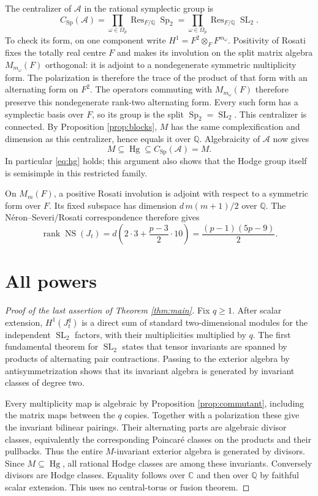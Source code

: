 \documentclass[11pt]{article}
\theoremstyle{remark}
\newcommand{\Q}{\mathbb Q}
\newcommand{\C}{\mathbb C}
\newcommand{\Hg}{\operatorname{Hg}}
\newcommand{\Sp}{\operatorname{Sp}}
\newcommand{\SL}{\operatorname{SL}}
\newcommand{\Res}{\operatorname{Res}}
\newcommand{\NS}{\operatorname{NS}}
\begin{document}
The centralizer of \(\mathcal A\) in the rational symplectic group is
\[
 C_{\Sp}(\mathcal A)=
       \prod_{\omega\in\Omega_p}\Res_{F/\Q}\Sp_2
       =\prod_{\omega\in\Omega_p}\Res_{F/\Q}\SL_2.
\]
To check its form, on one component write
\(H^1=F^2\otimes_F F^{m_\omega}\).  Positivity of Rosati fixes the
totally real centre \(F\) and makes its involution on the split matrix
algebra \(M_{m_\omega}(F)\) orthogonal: it is adjoint to a nondegenerate
symmetric multiplicity form.  The polarization is therefore the trace
of the product of that form with an alternating form on \(F^2\).
The operators commuting with \(M_{m_\omega}(F)\) therefore preserve
this nondegenerate rank-two alternating form.  Every such form has a
symplectic basis over \(F\), so its group is the split \(\Sp_2=\SL_2\).
This centralizer is connected.
By Proposition \ref{prop:blocks}, \(M\) has the same complexification
and dimension as this centralizer, hence equals it over \(\Q\).
Algebraicity of \(\mathcal A\) now gives
\[
 M\subseteq\Hg\subseteq C_{\Sp}(\mathcal A)=M.
\]
In particular \eqref{eq:hg} holds; this argument also shows that the
Hodge group itself is semisimple in this restricted family.

On \(M_m(F)\), a positive Rosati involution is adjoint with respect
to a symmetric form over \(F\).  Its fixed subspace has dimension
\(d\,m(m+1)/2\) over \(\Q\).
The N\'eron--Severi/Rosati correspondence therefore gives
\[
 \operatorname{rank}\NS(J_t)
 =d\left(2\cdot3+\frac{p-3}{2}\cdot10\right)
 =\frac{(p-1)(5p-9)}2.
\]

\section{All powers}
\begin{proof}[Proof of the last assertion of Theorem \ref{thm:main}]
Fix \(q\geq1\).  After scalar extension, \(H^1(J_t^q)\) is a direct
sum of standard two-dimensional modules for the independent
\(\SL_2\) factors, with their multiplicities multiplied by \(q\).
The first fundamental theorem for \(\SL_2\) states that tensor
invariants are spanned by products of alternating pair contractions.
Passing to the exterior algebra by antisymmetrization shows that its
invariant algebra is generated by invariant classes of degree two.

Every multiplicity map is algebraic by Proposition
\ref{prop:commutant}, including the matrix maps between the \(q\)
copies.  Together with a polarization these give the invariant
bilinear pairings.  Their alternating parts are algebraic divisor
classes, equivalently the corresponding Poincar\'e classes on the
products and their pullbacks.  Thus the entire \(M\)-invariant
exterior algebra is generated by divisors.
Since \(M\subseteq\Hg\), all rational Hodge classes are among these
invariants.  Conversely divisors are Hodge classes.  Equality follows
over \(\C\) and then over \(\Q\) by faithful scalar extension.
This uses no central-torus or fusion theorem.
\end{proof}
\end{document}
